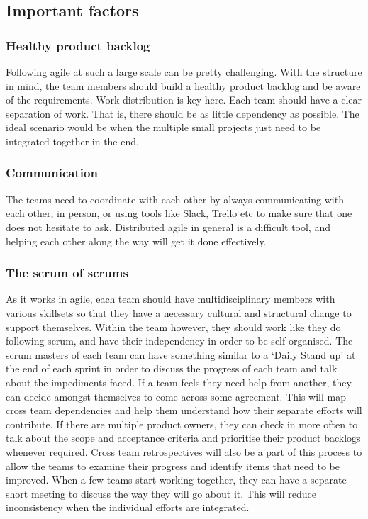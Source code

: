 \documentclass[sigconf]{acmart}
\begin{document}
\subsection{Important factors}

\subsubsection{Healthy product backlog}
Following agile at such a large scale can be pretty challenging. With the structure in mind, the team members should build a healthy product backlog and be aware of the requirements. Work distribution is key here. Each team should have a clear separation of work. That is, there should be as little dependency as possible. The ideal scenario would be when the multiple small projects just need to be integrated together in the end.

\subsubsection{Communication}
The teams need to coordinate with each other by always communicating with each other, in person, or using tools like Slack, Trello etc to make sure that one does not hesitate to ask. Distributed agile in general is a difficult tool, and helping each other along the way will get it done effectively.

\subsubsection{The scrum of scrums}
As it works in agile, each team should have multidisciplinary members with various skillsets so that they have a necessary cultural and structural change to support themselves. Within the team however, they should work like they do following scrum, and have their independency in order to be self organised. The scrum masters of each team can have something similar to a ‘Daily Stand up’ at the end of each sprint in order to discuss the progress of each team and talk about the impediments faced. If a team feels they need help from another, they can decide amongst themselves to come across some agreement. This will map cross team dependencies and help them understand how their separate efforts will contribute. If there are multiple product owners, they can check in more often to talk about the scope and acceptance criteria and prioritise their product backlogs whenever required. Cross team retrospectives will also be a part of this process to allow the teams to examine their progress and identify items that need to be improved. When a few teams start working together, they can have a separate short meeting to discuss the way they will go about it. This will reduce inconsistency when the individual efforts are integrated. 
\end{document}
